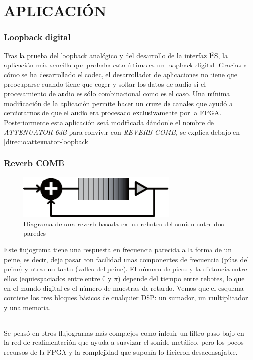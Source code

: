 \part{APLICACIÓN}

\section{Loopback digital}
	Tras la prueba del loopback analógico y del desarrollo de la interfaz I$^2$S, la  aplicación más sencilla que probaba esto último es un loopback digital. Gracias a cómo se ha desarrollado el codec, el desarrollador de aplicaciones no tiene que preocuparse cuando tiene que coger y soltar los datos de audio si el procesamiento de audio es sólo combinacional como es el caso.
	Una mínima modificación de la aplicación permite hacer un cruze de canales que ayudó a cerciorarnos de que el audio era procesado exclusivamente por la FPGA. Posteriormente esta aplicación será modificada dándonle el nombre de \emph{ATTENUATOR$\_$6dB} para convivir con \emph{REVERB$\_$COMB}, se explica debajo en \ref{directo:attenuator-loopback}

\section{Reverb COMB}
\begin{figure}[h]
\begin{center}
	\includegraphics[width=0.7\textwidth]{./reverb_simple_diagram-eps-converted-to}
\caption{Diagrama de una reverb basada en los rebotes del sonido entre dos paredes}
\end{center}
\end{figure}
	Este flujograma tiene una respuesta en frecuencia parecida a la forma de un peine, es decir, deja pasar con facilidad unas componentes de frecuencia (púas del peine) y otras no tanto (valles del peine). El número de picos y la distancia entre ellos (equiespaciados entre entre 0 y $\pi$) depende del tiempo entre rebotes, lo que en el mundo digital es el número de muestras de retardo. Vemos que el esquema contiene los tres bloques básicos de cualquier DSP: un sumador, un multiplicador y una memoria.
	
\paragraph{} Se pensó en otros flujogramas más complejos como inlcuir un filtro paso bajo en la red de realimentación que ayuda a suavizar el sonido metálico, pero los pocos recursos de la FPGA y la complejidad que suponía lo hicieron desaconsajable.
